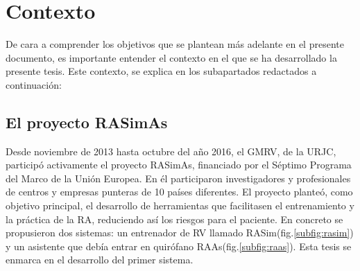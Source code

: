 \section{Contexto}

De cara a comprender los objetivos que se plantean más adelante en el presente documento, es importante entender el contexto en el que se ha desarrollado la presente tesis. 
Este contexto, se explica en los subapartados redactados a continuación:


\subsection{El proyecto RASimAs}
\label{intro:rasimas}

Desde noviembre de 2013 hasta octubre del año 2016, el \ac{GMRV}, de la \ac{URJC}, participó activamente el proyecto \ac{RASimAs}\cite{rasimasweb}, financiado por el Séptimo Programa del Marco de la Unión Europea. En él participaron investigadores y profesionales de centros y empresas punteras de 10 países diferentes. El proyecto planteó, como objetivo principal, el desarrollo de herramientas que facilitasen el entrenamiento y la práctica de la \ac{RA}, reduciendo así los riesgos para el paciente. En concreto se propusieron dos sistemas: un entrenador de \ac{RV} llamado \ac{RASim}(fig.\ref{subfig:rasim}) y un asistente que debía entrar en quirófano \ac{RAAs}(fig.\ref{subfig:raas}). Esta tesis se enmarca en el desarrollo del primer sistema.

